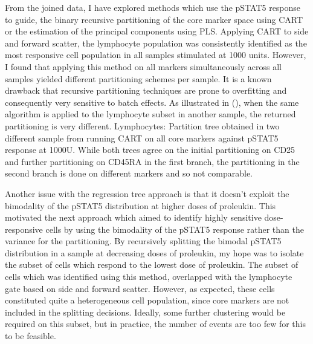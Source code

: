 From the joined data, I have explored methods which use the pSTAT5 response to guide, the binary recursive partitioning of the core marker space using \gls{CART} or the estimation of the principal components using \gls{PLS}.
Applying \gls{CART} to side and forward scatter, the lymphocyte population was consistently identified as the most responsive cell population in all samples stimulated at 1000 units.
However, I found that applying this method on all markers simultaneously across all samples yielded different partitioning schemes per sample.
It is a known drawback that recursive partitioning techniques are prone to overfitting and consequently very sensitive to batch effects.
As illustrated in (), when the same algorithm is applied to the lymphocyte subset in another sample, the returned partitioning is very different.
{ Lymphocytes: Partition tree obtained in two different sample from running CART on all core markers against pSTAT5 response at 1000U. }
{
  While both trees agree on the initial partitioning on CD25 and further partitioning on CD45RA in the first branch,
  the partitioning in the second branch is done on different markers and so not comparable.
} 


Another issue with the regression tree approach is that it doesn't exploit the bimodality of the pSTAT5 distribution at higher doses of proleukin.
This motivated the next approach which aimed to identify highly sensitive dose-responsive cells by using the bimodality of the pSTAT5 response rather than the variance for the partitioning.
By recursively splitting the bimodal pSTAT5 distribution in a sample at decreasing doses of proleukin, my hope was to isolate the subset of cells which respond to the lowest dose of proleukin.
The subset of cells which was identified using this method, overlapped with the lymphocyte gate based on side and forward scatter.
However, as expected, these cells constituted quite a heterogeneous cell population, since core markers are not included in the splitting decisions.
Ideally, some further clustering would be required on this subset, but in practice, the number of events are too few for this to be feasible.

